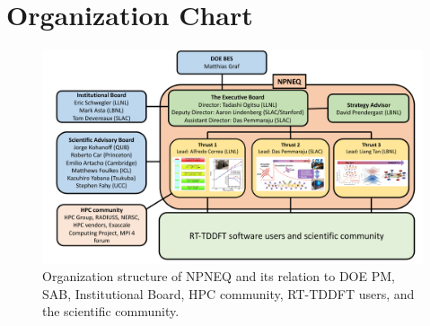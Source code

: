\section{Organization Chart}
\label{sec:organization}

\begin{figure}[ht]
    \centering\includegraphics[width=1.0\linewidth]{figures/OrganizationalStructure.pdf}
    \caption{Organization structure of NPNEQ and its relation to DOE PM, SAB, Institutional Board, HPC community, RT-TDDFT users, and the scientific community.}
    \label{fig:organization}
\end{figure}

\clearpage

